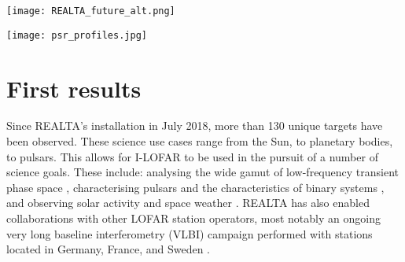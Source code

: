 \begin{figure*}[t]
    \centering
    \texttt{[image: REALTA\_future\_alt.png]}
    \caption[System diagram for REALTA.]{System diagram for REALTA, including future data preparation, processing, and archiving capabilities. Solid lines indicate existing features, while dashed lines denote stages under development. REALTA is currently capable of capturing data from the I-LOFAR radio telescope and archiving it in near real-time. We are in the process of developing a variety of data processing pipelines that will flag RFI, identify and characterise SRBs, pulsars, RRATs, FRBs, and SETI signals. Machine learning methods are being explored for a number of these tasks.}
    \label{fig:REALTA_future}
\end{figure*}

\begin{figure*}[t]
    \centering
    \texttt{[image: psr\_profiles.jpg]}
    \caption[Sample of 19 pulsars observed with I-LOFAR and REALTA.]{Sample of 19 pulsars observed with I-LOFAR and REALTA. Each of these observations is 6 minutes in duration and were taken on 4--5 March 2020 using the HBA antennas (\SIrange{110}{190}{\mega \hertz}). The data were processed using the method described in section \ref{sec:pulsarproc} and plotted using \texttt{PSRCHIVE}. The x-axis in each plot is the pulse phase in radians, while the y-axis is flux density in arbitrary units.}
    \label{fig:pulsar-pc1}
\end{figure*}

\section{First results}
\label{sec:results}
Since REALTA's installation in July 2018, more than 130 unique targets have been observed. These science use cases range from the Sun, to planetary bodies, to pulsars. This allows for I-LOFAR to be used in the pursuit of a number of science goals. These include: analysing the wide gamut of low-frequency transient phase space \citep{KeanePhaseSpace2018}, characterising pulsars and the characteristics of binary systems \citep{Manchester2017}, and observing solar activity and space weather \citep{Maguire2020}. 
REALTA has also enabled collaborations with other LOFAR station operators, most notably an ongoing very long baseline interferometry (VLBI) campaign performed with stations located in Germany, France, and Sweden \citep[in a continuation of ][]{Wucknitz2019}.

